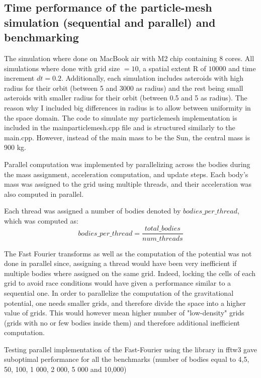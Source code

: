 \documentclass{article}
\begin{document}
\subsection{Time performance of the particle-mesh simulation (sequential and parallel) and benchmarking}
The simulation where done on MacBook air with M2 chip containing 8 cores.
All simulations where done with grid size $= 10$, a spatial extent R of $10 000$ and time increment $dt = 0.2$. Additionally, each simulation includes asteroids with high radius for their orbit (between 5 and 3000  as radius)  and the rest being small asteroids with smaller radius for their orbit (between 0.5 and 5 as radius). 
The reason why I included big differences in radius is to allow between uniformity in the space domain. 
The code to simulate my particlemesh implementation is included in the mainparticlemesh.cpp file and is structured similarly to the main.cpp.
However, instead of the main mass to be the Sun, the central mass is 900 kg. 

Parallel computation was implemented by parallelizing across the bodies during the mass assignment, acceleration computation, and update steps. Each body's mass was assigned to the grid using multiple threads, and their acceleration was also computed in parallel. 

Each thread was assigned a number of bodies denoted by \( \mathit{bodies\_per\_thread} \), which was computed as:
\begin{equation}
    \mathit{bodies\_per\_thread} = \frac{\mathit{total\_bodies}}{\mathit{num\_threads}}
\end{equation}



The Fast Fourier transforms as well as the computation of the potential was not done in parallel since, assigning a thread would have been very inefficient if multiple bodies where assigned on the same grid. Indeed, locking the cells of each grid to avoid race conditions would have given a performance similar to a sequential one. In order to parallelize the computation of the gravitational potential, one needs smaller grids, and therefore divide the space into a higher value of grids. This would however mean higher number of "low-density" grids (grids with no or few bodies inside them) and therefore additional inefficient computation. 

Testing parallel implementation  of the Fast-Fourier using the library in fftw3 gave suboptimal performance for all the benchmarks (number of bodies equal to 4,5, 50, 100, 1 000, 2 000, 5 000 and 10,000)
\end{document}
